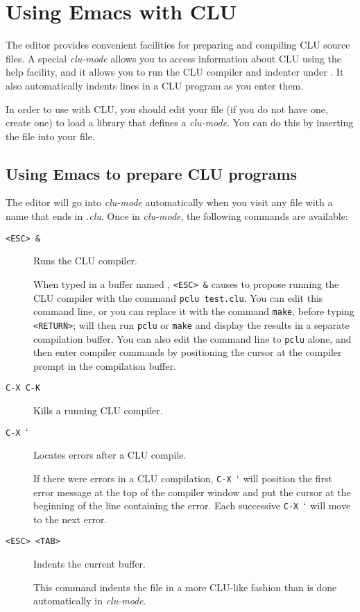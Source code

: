 \section{Using Emacs with CLU}
\label{emacs}

The  editor provides convenient facilities for preparing and
compiling CLU source files.  A special {\it clu-mode} allows you to access
information about CLU using the  help facility, and it allows you
to run the CLU compiler and indenter under .  It also
automatically indents lines in a CLU program as you enter them.

In order to use  with CLU, you should edit your  file
(if you do not have one, create one) to load a library that defines a {\it
clu-mode}.  You can do this by inserting the file  into
your  file.

\subsection{Using Emacs to prepare CLU programs}

The  editor will go into {\it clu-mode} automatically when you
visit any file with a name that ends in {\it .clu}.  Once in {\it clu-mode},
the following commands are available:
\begin{description}
\item[{\tt <ESC> \&}]	Runs the CLU compiler.  

When typed in a buffer named , {\tt <ESC> \&} causes
 to propose running the CLU compiler with the command {\tt pclu
test.clu}.  You can edit this command line, or you can replace it with the
command {\tt make}, before typing {\tt <RETURN>};  will then run
{\tt pclu} or {\tt make} and display the results in a separate compilation
buffer.  You can also edit the command line to {\tt pclu} alone, and then enter
compiler commands by positioning the cursor at the compiler prompt in the
compilation buffer.

\item[{\tt C-X C-K}]	Kills a running CLU compiler.

\item[{\tt C-X $`$}]	Locates errors after a CLU compile.  

If there were errors in a CLU compilation, {\tt C-X $`$} will position the
first error message at the top of the compiler window and put the cursor at the
beginning of the line containing the error.  Each successive {\tt C-X $`$} will
move to the next error.

\item[{\tt <ESC> <TAB>}]	Indents the current buffer.  

This command indents the file in a more CLU-like fashion than is done
automatically in {\it clu-mode}.
\end{description}

